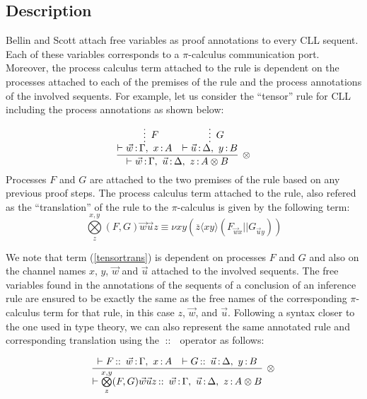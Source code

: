 \documentclass[copyright,creativecommons]{eptcs}
\DeclareMathOperator{\cc}{::\ }
\DeclareMathOperator{\cln}{:}
\begin{document}
\subsection{Description}
\label{papdesc}

Bellin and Scott attach free variables as proof annotations to every CLL sequent. Each of these variables corresponds to a $\pi$-calculus communication port. Moreover, the process calculus term attached to the rule is dependent on the processes attached to each of the premises of the rule and the process annotations of the involved sequents. For example, let us consider the ``tensor'' rule for CLL including the process annotations as shown below:

\begin{equation}
		\infer[\otimes]{\vdash \vec{w} \cln \Gamma,\ \vec{u} \cln \Delta,\ z \cln A\otimes B}{
		\infer*[F]{\vdash \vec{w} \cln \Gamma,\ x \cln A}{}
		&
		\infer*[G]{\vdash \vec{u} \cln \Delta,\ y \cln B}{}
		}
\end{equation}
Processes $F$ and $G$ are attached to the two premises of the rule based on any previous proof steps. The process calculus term attached to the rule, also refered as the ``translation'' of the rule to the $\pi$-calculus is given by the following term:
\begin{equation}
\label{tensortrans}
\overset{x,y}{\underset{z}{\bigotimes}}(F,G)\vec{w}\vec{u}z \equiv \nu x y (\overline{z}\langle xy \rangle(F_{\vec{w}x} || G_{\vec{u}y}))
\end{equation}

We note that term (\ref{tensortrans}) is dependent on processes $F$ and $G$ and also on the channel names $x$, $y$, $\vec{w}$ and $\vec{u}$ attached to the involved sequents. The free variables found in the annotations of the sequents of a conclusion of an inference rule are ensured to be exactly the same as the free names of the corresponding $\pi$-calculus term for that rule, in this case $z$, $\vec{w}$, and $\vec{u}$. Following a syntax closer to the one used in type theory, we can also represent the same annotated rule and corresponding translation using the $\cc$ operator as follows:

\begin{equation}
		\infer[\otimes]{\vdash \overset{x,y}{\underset{z}{\bigotimes}}(F,G)\vec{w}\vec{u}z \cc \vec{w} \cln \Gamma,\ \vec{u} \cln \Delta,\ z \cln A\otimes B}{
		\vdash F \cc \vec{w} \cln \Gamma,\ x \cln A
		&
		\vdash G \cc \vec{u} \cln \Delta,\ y \cln B
		}
\end{equation}
\end{document}
